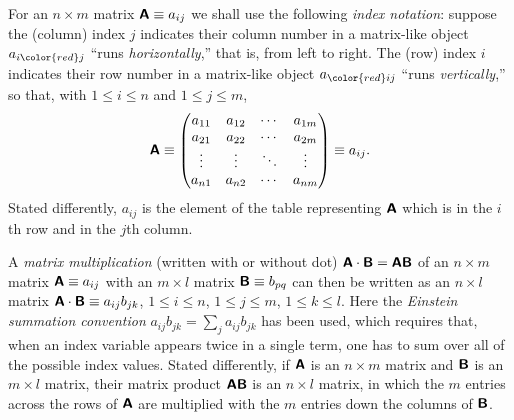For an $n \times m$ matrix $\textsf{\textbf{A}}\equiv a_{ij}$ we shall use the following {\em index notation}:
suppose the (column) index $j$  indicates their column number in a matrix-like object $a_{i{\color{red} j}}$ ``runs {\em horizontally},'' that is, from left to right.
The (row) index $i$  indicates their row number in a matrix-like object  $a_{{\color{red}  i}j}$ ``runs {\em vertically},''
so that, with
$1 \le i \le n$ and
$1 \le j \le m$,
\begin{equation}
\textsf{\textbf{A}}
\equiv
\begin{pmatrix}
a_{11}&a_{12}& \cdots & a_{1m}\\
a_{21}&a_{22}& \cdots & a_{2m}\\
\vdots &\vdots & \ddots & \vdots \\
a_{n1}&a_{n2}& \cdots & a_{nm}
\end{pmatrix}
\equiv a_{ij}
.
\label{2016-m-ch-fdvs-matrixind}
\end{equation}
Stated differently, $a_{ij}$ is the element  of the table representing $\textsf{\textbf{A}}$ which is in the $i$th row and in the $j$th column.

A {\em matrix multiplication}
 (written with or without dot)
$\textsf{\textbf{A}} \cdot \textsf{\textbf{B}} = \textsf{\textbf{A}}  \textsf{\textbf{B}}$
of an $n \times m$ matrix $\textsf{\textbf{A}}\equiv a_{ij}$
with an $m \times l$ matrix $\textsf{\textbf{B}}\equiv b_{pq}$
can then be written as an $n \times l$ matrix
$\textsf{\textbf{A}} \cdot \textsf{\textbf{B}} \equiv a_{ij}b_{jk}$,
$1\le i\le n$,
$1\le j\le m$,
$1\le k\le l$.
Here the {\em Einstein summation convention}
$a_{ij}b_{jk} = \sum_j a_{ij}b_{jk}$
has been used,
which requires that, when an index variable appears twice in a single term, one has to
sum over all of the possible index values.
Stated differently, if $\textsf{\textbf{A}}$ is an $n \times m$ matrix and $\textsf{\textbf{B}}$ is an $m \times l$ matrix,
their matrix product $\textsf{\textbf{A}}\textsf{\textbf{B}}$ is an $n \times l$ matrix, in which the $m$
entries across the rows of $\textsf{\textbf{A}}$ are multiplied with the $m$ entries down the columns of $\textsf{\textbf{B}}$.

